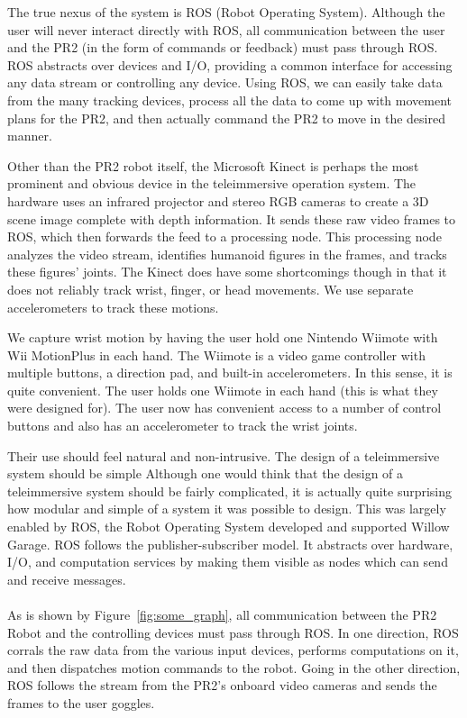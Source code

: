 \documentclass{sig-alternate}
\begin{document}
The true nexus of the system is ROS (Robot Operating System). Although the
user will never interact directly with ROS, all communication between the
user and the PR2 (in the form of commands or feedback) must pass through ROS.
ROS abstracts over devices and I/O, providing a common interface for accessing
any data stream or controlling any device. Using ROS, we can easily take
data from the many tracking devices, process all the data to come up with
movement plans for the PR2, and then actually command the PR2 to move in the
desired manner.

Other than the PR2 robot itself, the Microsoft Kinect is perhaps the most 
prominent and obvious device in the teleimmersive operation system. The
hardware uses an 
infrared projector and stereo RGB cameras to create a 3D scene image complete
with depth information. It sends these raw video frames to ROS, which then
forwards the feed to a processing node. This processing node analyzes the 
video stream, identifies humanoid figures in the frames, and tracks these 
figures' joints. The Kinect does have some shortcomings though in that it does 
not reliably track wrist, finger, or head movements. We use separate 
accelerometers to track these motions.

We capture wrist motion by having the user hold one Nintendo Wiimote with 
Wii MotionPlus in each hand. The Wiimote is a video game controller with 
multiple buttons, a direction pad, and built-in accelerometers. In this sense,
it is quite convenient. The user holds one Wiimote in each hand (this is 
what they were designed for). The user now has convenient access to a number of
control buttons and also has an accelerometer to track the wrist joints.

Their use should feel natural and non-intrusive. 
The design of a teleimmersive system should be simple
Although one would think that the design of a teleimmersive system should be
fairly complicated, it is actually quite surprising how modular and simple of
a system it was possible to design. This was largely enabled by ROS, the Robot
Operating System developed and supported Willow Garage. ROS follows the
publisher-subscriber model. It abstracts over hardware, I/O, and computation
services by making them visible as nodes which can send and receive messages.
\\
\\As is shown by Figure~\ref{fig:some_graph}, all communication between the 
PR2 Robot and the controlling devices must pass through ROS. In one direction,
ROS corrals the raw data from the various input devices, performs computations
on it, and then dispatches motion commands to the robot. Going in the other
direction, ROS follows the stream from the PR2's onboard video cameras and
sends the frames to the user goggles.
\end{document}
